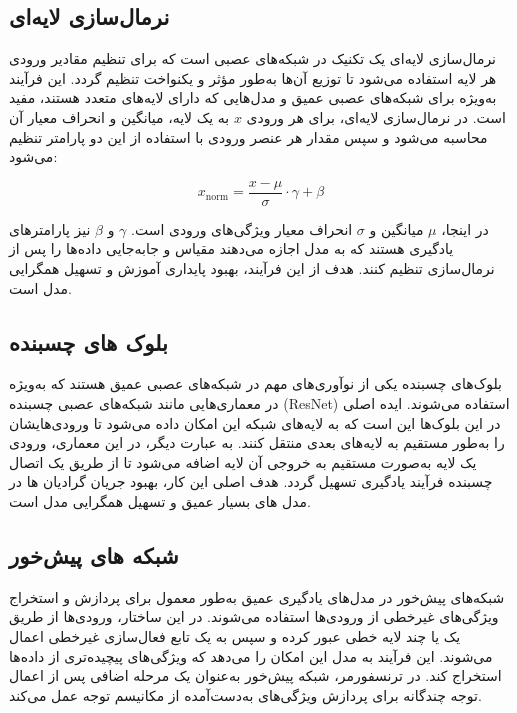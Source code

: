 \subsection{نرمال‌سازی لایه‌ای}

نرمال‌سازی لایه‌ای%
یک تکنیک در شبکه‌های عصبی است که برای تنظیم مقادیر ورودی هر لایه استفاده می‌شود تا توزیع آن‌ها به‌طور مؤثر و یکنواخت تنظیم گردد. این فرآیند به‌ویژه برای شبکه‌های عصبی عمیق و مدل‌هایی که دارای لایه‌های متعدد هستند، مفید است. در نرمال‌سازی لایه‌ای، برای هر ورودی $x$ به یک لایه، میانگین و انحراف معیار آن محاسبه می‌شود و سپس مقدار هر عنصر ورودی با استفاده از این دو پارامتر تنظیم می‌شود:

\[
x_{\text{norm}} = \frac{x - \mu}{\sigma} \cdot \gamma + \beta
\]

در اینجا، $\mu$ میانگین و $\sigma$ انحراف معیار ویژگی‌های ورودی است. $\gamma$ و $\beta$ نیز پارامترهای یادگیری هستند که به مدل اجازه می‌دهند مقیاس و جابه‌جایی داده‌ها را پس از نرمال‌سازی تنظیم کنند. هدف از این فرآیند، بهبود پایداری آموزش و تسهیل همگرایی مدل است.

\subsection{بلوک های چسبنده}
بلوک‌های چسبنده%
\cite{heDeepResidualLearning2015}%
یکی از نوآوری‌های مهم در شبکه‌های عصبی عمیق هستند که به‌ویژه در معماری‌هایی مانند شبکه‌های عصبی چسبنده (ResNet) استفاده می‌شوند. ایده اصلی در این بلوک‌ها این است که به لایه‌های شبکه این امکان داده می‌شود تا ورودی‌هایشان را به‌طور مستقیم به لایه‌های بعدی منتقل کنند. به عبارت دیگر، در این معماری، ورودی یک لایه به‌صورت مستقیم به خروجی آن لایه اضافه می‌شود تا از طریق یک اتصال چسبنده فرآیند یادگیری تسهیل گردد. هدف اصلی این کار، بهبود جریان گرادیان ها در مدل های بسیار عمیق و تسهیل همگرایی مدل است.


\subsection{شبکه های پیش‌خور\protect{}}

شبکه‌های پیش‌خور در مدل‌های یادگیری عمیق به‌طور معمول برای پردازش و استخراج ویژگی‌های غیرخطی از ورودی‌ها استفاده می‌شوند. در این ساختار، ورودی‌ها از طریق یک یا چند لایه خطی عبور کرده و سپس به یک تابع فعال‌سازی غیرخطی اعمال می‌شوند. این فرآیند به مدل این امکان را می‌دهد که ویژگی‌های پیچیده‌تری از داده‌ها استخراج کند. در ترنسفورمر، شبکه پیش‌خور به‌عنوان یک مرحله اضافی پس از اعمال توجه چندگانه برای پردازش ویژگی‌های به‌دست‌آمده از مکانیسم توجه عمل می‌کند.

